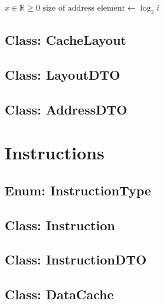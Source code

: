 \documentclass[a4paper]{scrreprt}
\begin{document}
\begin{algorithmic}
\State $x \in \mathbb{R} \geq 0$ 
    \State $\text{size of address element} \gets \log _2 i$ 
\EndIf
\end{algorithmic}

\subsection{Class: CacheLayout}
\label{subsec:cachelayout.java}


\subsection{Class: LayoutDTO}
\label{subsec:layoutdto.java}


\subsection{Class: AddressDTO}
\label{subsec:addressdto.java}


\section{Instructions}

\subsection{Enum: InstructionType}
\label{subsec:instructiontype.java}


\subsection{Class: Instruction}
\label{subsec:instruction.java}


\subsection{Class: InstructionDTO}
\label{subsec:instructiondto.java}


\subsection{Class: DataCache}
\label{subsec:datacache.java}

\end{document}
